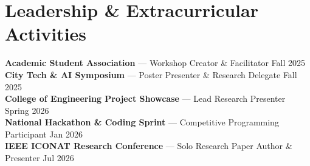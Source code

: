 
\section*{Leadership \& Extracurricular Activities}

\textbf{Academic Student Association} --- Workshop Creator \& Facilitator \hfill Fall 2025\\
\textbf{City Tech \& AI Symposium} --- Poster Presenter \& Research Delegate \hfill Fall 2025\\
\textbf{College of Engineering Project Showcase} --- Lead Research Presenter \hfill Spring 2026\\
\textbf{National Hackathon \& Coding Sprint} --- Competitive Programming Participant \hfill Jan 2026\\
\textbf{IEEE ICONAT Research Conference} --- Solo Research Paper Author \& Presenter \hfill Jul 2026
